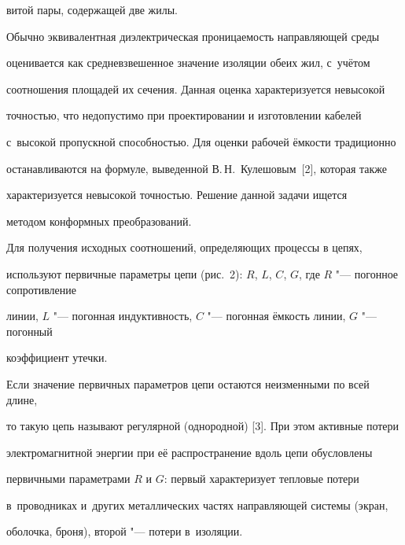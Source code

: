 витой пары, содержащей две жилы.









Обычно эквивалентная диэлектрическая проницаемость направляющей среды 

оценивается как средневзвешенное значение изоляции обеих жил, с~учётом 

соотношения площадей их сечения. Данная оценка характеризуется невысокой 

точностью, что недопустимо при проектировании и изготовлении кабелей 

с~высокой пропускной способностью. Для оценки рабочей ёмкости традиционно 

останавливаются на формуле, выведенной В.\,Н.~Кулешовым~[2], которая также 

характеризуется невысокой точностью. Решение данной задачи ищется

методом конформных преобразований.







Для получения исходных соотношений, определяющих процессы в цепях, 

используют первичные параметры цепи (рис.~2): $R$, $L$, $C$, $G$, где $R$ "--- погонное сопротивление 

линии, $L$ "--- погонная индуктивность, $C$ "--- погонная ёмкость линии, $G$ "--- погонный 

коэффициент утечки. 







Если значение первичных параметров цепи остаются неизменными по всей длине, 

то такую цепь называют регулярной (однородной) [3]. При этом активные потери 

электромагнитной энергии при её распространение вдоль цепи обусловлены 

первичными параметрами $R$ и $G$: первый характеризует тепловые потери 

в~проводниках и~других металлических частях направляющей системы (экран, 

оболочка, броня), второй "--- потери в~изоляции. 



